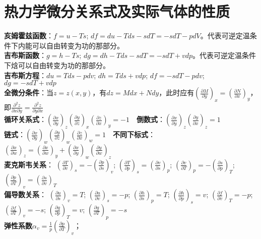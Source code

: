 \documentclass[a4paper,9pt]{ctexart}
\begin{document}
\section{热力学微分关系式及实际气体的性质}
\noindent
\textbf{亥姆霍兹函数}：$f=u-Ts$; $df=du-Tds-sdT=-sdT-pdV$。代表可逆定温条件下内能可以自由转变为功的那部分。\\
\textbf{吉布斯函数}：$g=h-Ts$; $dg=dh-Tds-sdT=-sdT+vdp$。代表可逆定温条件下焓可以自由转变为功的那部分。\\
\textbf{吉布斯方程}：$du=Tds-pdv$; $dh=Tds+vdp$; $df=-sdT-pdv$; $dg=-sdT+vdp$\\
\textbf{全微分条件}：当$z=z(x,y)$，有$dz=Mdx+Ndy$，此时应有$\left(\frac{\partial M}{\partial y}\right)_x=\left(\frac{\partial N}{\partial x}\right)_y$，即$\frac{\partial^2z}{\partial x\partial y}=\frac{\partial^2z}{\partial y\partial x}$\\
\textbf{循环关系式}：$\left(\frac{\partial x}{\partial y}\right)_z\left(\frac{\partial y}{\partial z}\right)_x\left(\frac{\partial z}{\partial x}\right)_y=-1$\ \
\textbf{倒数式}：$\left(\frac{\partial x}{\partial y}\right)_z\left(\frac{\partial y}{\partial x}\right)_z=1$\\
\textbf{链式}：$\left(\frac{\partial x}{\partial y}\right)_w\left(\frac{\partial y}{\partial z}\right)_w\left(\frac{\partial z}{\partial x}\right)_w=1$\ \
\textbf{不同下标式}：$\left(\frac{\partial x}{\partial w}\right)_z=\left(\frac{\partial x}{\partial w}\right)_y+\left(\frac{\partial x}{\partial y}\right)_w\left(\frac{\partial y}{\partial w}\right)_z$\\
\textbf{麦克斯韦关系}：
$\left(\frac{\partial T}{\partial v}\right)_s=-\left(\frac{\partial p}{\partial s}\right)_v$; 
$\left(\frac{\partial T}{\partial p}\right)_s=\left(\frac{\partial v}{\partial s}\right)_p$; 
$\left(\frac{\partial v}{\partial T}\right)_p=-\left(\frac{\partial s}{\partial p}\right)_T$; 
$\left(\frac{\partial p}{\partial T}\right)_v=\left(\frac{\partial s}{\partial v}\right)_T$\\
\textbf{偏导数关系}：
$\left(\frac{\partial u}{\partial s}\right)_v=T$; 
$\left(\frac{\partial u}{\partial v}\right)_s=-p$; 
$\left(\frac{\partial h}{\partial s}\right)_p=T$; 
$\left(\frac{\partial h}{\partial p}\right)_s=v$; 
$\left(\frac{\partial f}{\partial v}\right)_T=-p$; 
$\left(\frac{\partial f}{\partial T}\right)_v=-s$; 
$\left(\frac{\partial g}{\partial p}\right)_T=v$; 
$\left(\frac{\partial g}{\partial T}\right)_p=-s$\\
\textbf{弹性系数}$\alpha_v=\frac{1}{p}\left(\frac{\partial p}{\partial T}\right)_v$；
\end{document}
